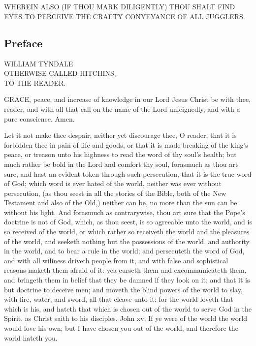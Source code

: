 \section*{}

\begin{center}\tiny
WHEREIN ALSO (IF THOU MARK DILIGENTLY) THOU SHALT
FIND EYES TO PERCEIVE THE CRAFTY CONYEYANCE OF ALL JUGGLERS.
\end{center}

\subsection*{Preface}
\begin{center}
WILLIAM TYNDALE\\
OTHERWISE CALLED HITCHINS,\\
TO THE READER. 
\end{center}

GRACE, peace, and increase of knowledge in 
our Lord Jesus Christ be with thee, reader, 
and with all that call on the name of the Lord 
unfeignedly, and with a pure conscience. Amen. 

Let it not make thee despair, neither yet discourage
thee, O reader, that it is forbidden thee 
in pain of life and goods, or that it is made 
breaking of the king's peace, or treason unto his
highness to read the word of thy soul's health;
but much rather be bold in the Lord and comfort
thy soul, forasmuch as thou art sure, and hast an 
evident token through such persecution, that it is 
the true word of God; which word is ever hated 
of the world, neither was ever without persecution,
(as thou seest in all the stories of the 
Bible, both of the New Testament and also of the 
Old,) neither can be, no more than the sun can be
without his light. And forasmuch as contrarywise,
thou art sure that the Pope's doctrine is
not of God, which, as thou seest, is so agreeable 
unto the world, and is so received of the world, 
or which rather so receiveth the world and the 
pleasures of the world, and seeketh nothing but 
the possessions of the world, and authority in the 
world, and to bear a rule in the world; and persecuteth
the word of God, and with all wiliness 
driveth people from it, and with false and sophistical
reasons maketh them afraid of it: yea curseth 
them and excommunicateth them, and bringeth 
them in belief that they be damned if they look 
on it; and that it is but doctrine to deceive men; 
and moveth the blind powers of the world to 
slay, with fire, water, and sword, all that cleave 
unto it: for the world loveth that which is his, 
and hateth that which is chosen out of the world 
to serve God in the Spirit, as Christ saith to his 
disciples, John xv. If ye were of the world the 
world would love his own; but I have chosen you 
out of the world, and therefore the world hateth 
you. 

